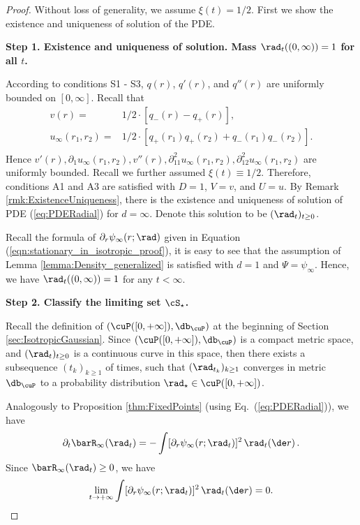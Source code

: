\documentclass[11pt]{article}
\begin{document}
\begin{proof} Without loss of generality, we assume $\xi(t) = 1/2$. First we show the existence and uniqueness of solution of the PDE.

\vskip 0.2cm
\noindent
{\bf Step 1. Existence and uniqueness of solution. Mass $\rad_t((0, \infty)) = 1$ for all $t$. }

According to conditions {\sf S1} - {\sf S3}, $q(r)$, $q'(r)$, and $q''(r)$ are uniformly bounded on $[0, \infty]$. Recall that
\[
\begin{aligned}
v(r) =& 1/2 \cdot [q_-(r) - q_+(r)],\\
u_\infty(r_1, r_2) =& 1/2 \cdot [q_+(r_1) q_+(r_2) + q_-(r_1) q_-(r_2)].\\
\end{aligned}
\]
Hence $v'(r), \partial_1 u_\infty(r_1, r_2), v''(r), \partial_{11}^2 u_\infty(r_1, r_2), \partial_{12}^2 u_\infty(r_1, r_2)$ are uniformly bounded. Recall we further assumed $\xi(t) \equiv 1/2$. Therefore, conditions {\sf A1} and {\sf A3} are satisfied with $D = 1$, $V = v$, and $U = u$. By Remark \ref{rmk:ExistenceUniqueness}, there is the existence and uniqueness of solution of PDE (\ref{eq:PDERadial}) for $d = \infty$. Denote this solution to be $(\rad_t)_{t \ge 0}$. 

Recall the formula of $\partial_r \psi_\infty(r; \rad)$ given in Equation (\ref{eqn:stationary_in_isotropic_proof}), it is easy to see that the assumption of Lemma \ref{lemma:Density_generalized} is satisfied with $d = 1$ and $\Psi = \psi_\infty$. Hence, we have $\rad_t((0, \infty)) = 1$ for any $t < \infty$. 


\vskip 0.2cm
\noindent
{\bf Step 2. Classify the limiting set $\cS_\star$. }

Recall the definition of $(\cuP([0, +\infty]), \db_\cuP)$ at the beginning of Section \ref{sec:IsotropicGaussian}. Since $(\cuP([0, +\infty]), \db_\cuP)$ is a compact metric space, and $( \rad_t )_{t \ge 0}$ is a continuous curve in this space, then there exists a subsequence $(t_k)_{k \ge 1}$ of times, such that $(\rad_{t_k})_{k \ge 1}$ converges in metric $\db_\cuP$ to a probability distribution $\rad_\star \in \cuP([0, +\infty])$. 

Analogously to Proposition \ref{thm:FixedPoints} (using Eq.~(\ref{eq:PDERadial})),  we have
\[
\partial_t \barR_\infty(\rad_t) = -\int  [\partial_r \psi_\infty(r; \rad_t)]^2\, \rad_t(\de r)\, . 
\]
Since $\barR_\infty(\rad_t)\ge 0$, we have
\[
\lim_{t\rightarrow+\infty} \int  [\partial_r \psi_\infty(r; \rad_t)]^2\, \rad_t(\de r) = 0. 
\]


\end{proof}
\end{document}
